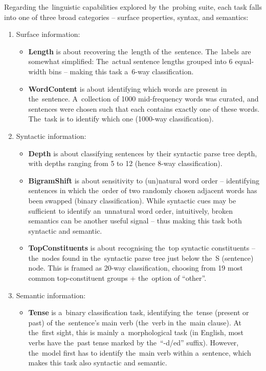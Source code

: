 \documentclass[bsc,frontabs,singlespacing,parskip,deptreport]{infthesis}
\begin{document}
{{    Regarding the~linguistic capabilities explored by the~probing suite, each task falls into one of three broad categories -- surface properties, syntax, and semantics:
    \begin{enumerate}
      \item {Surface information:
        \begin{itemize}
          \item \textbf{Length} is about recovering the~length of the~sentence. The~labels are somewhat simplified: The~actual sentence lengths grouped into 6 equal-width bins -- making this task a~6-way classification.
          \item \textbf{WordContent} is about identifying which words are present in the~sentence. A~collection of 1000 mid-frequency words was curated, and sentences were chosen such that each contains exactly one of these words. The~task is to identify which one (1000-way classification).
        \end{itemize}
      }
      \item{Syntactic information:
        \begin{itemize}
          \item \textbf{Depth} is about classifying sentences by their syntactic parse tree depth, with depths ranging from 5 to 12 (hence 8-way classification).
          \item \textbf{BigramShift} is about sensitivity to (un)natural word order -- identifying sentences in which the~order of two randomly chosen adjacent words has been swapped (binary classification). While syntactic cues may be sufficient to identify an~unnatural word order, intuitively, broken semantics can be another useful signal -- thus making this task both syntactic and semantic.
          \item \textbf{TopConstituents} is about recognising the~top syntactic constituents -- the~nodes found in the~syntactic parse tree just below the~S (sentence) node. This is framed as 20-way classification, choosing from 19 most common top-constituent groups + the~option of ``other''.
        \end{itemize}
      }
      \item{Semantic information:
        \begin{itemize}
          \item \textbf{Tense} is a~binary classification task, identifying the~tense (present or past) of the~sentence's main verb (the~verb in the~main clause). At the~first sight, this is mainly a~morphological task (in English, most verbs have the~past tense marked by the~``-d/ed'' suffix). However, the~model first has to identify the~main verb within a~sentence, which makes this task also syntactic and semantic.

\end{itemize}}
\end{enumerate}}}
\end{document}

